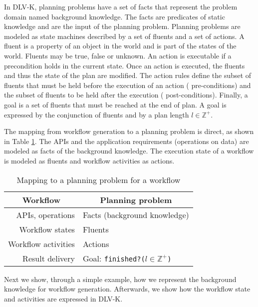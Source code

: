 In DLV-K, planning problems have a set of facts that represent the problem domain named background knowledge. The facts are predicates of static knowledge and are the input of the planning problem. Planning problems are modeled as state machines described by a set of fluents and a set of actions. A fluent is a property of an object in the world and is part of the states of the world. Fluents may be true, false or unknown. An action is executable if a precondition holds in the current state. Once an action is executed, the fluents and thus the state of the plan are modified. The action rules define the subset of fluents that must be held before the execution of an action (\ie{} pre-conditions) and the subset of fluents to be held after the execution (\ie{} post-conditions). Finally, a goal is a set of fluents that must be reached at the end of plan. A goal is expressed by the conjunction of fluents and by a plan length $l \in \mathds{Z}^{+}$.

The mapping from workflow generation to a planning problem is direct, as shown in Table \ref{tab:mappingQW-PP}. The APIs and the application requirements (operations on data) are modeled as facts of the background knowledge. The execution state of a workflow is modeled as fluents and workflow activities as actions.

	\begin{table}
	   \begin{center}
	      \begin{tabular}{|r|l|}
	         \hline
	         \multicolumn{1}{|c|}{\textbf{Workflow }}& \multicolumn{1}{c|}{\textbf{Planning problem}} \\
	         \hline
	         APIs, operations & Facts (background knowledge) \\
	         \hline
	         Workflow states & Fluents \\
	         \hline
	         Workflow activities & Actions \\
	         \hline
	         Result delivery & Goal: \texttt{finished?(}$l \in \mathds{Z}^{+}$\texttt{)} \\
	         \hline
	      \end{tabular}
	   \end{center} 
	   \caption{Mapping to a planning problem for a workflow}
	   \label{tab:mappingQW-PP}
	\end{table}

Next we show, through a simple example, how we represent the background knowledge for workflow generation. Afterwards, we show how the workflow state and activities are expressed in DLV-K.

